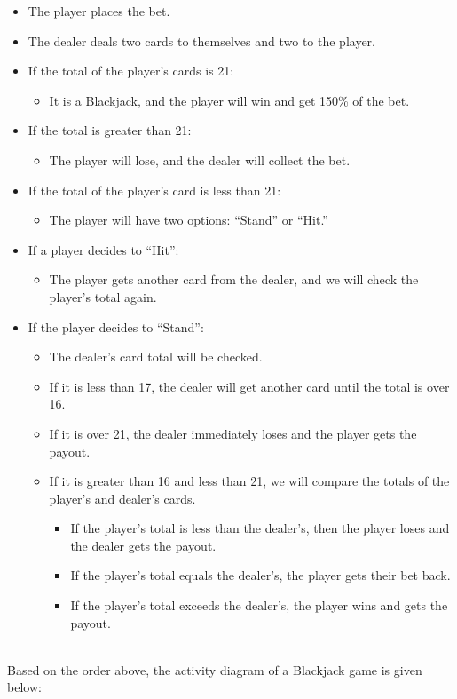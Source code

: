 \begin{itemize}
\item
The player places the bet.
\item
The dealer deals two cards to themselves and two to the player.
\item
If the total of the player's cards is 21:

\begin{itemize}
\item
It is a Blackjack, and the player will win and get 150\% of the bet.
\end{itemize}
\item
If the total is greater than 21:

\begin{itemize}
\item
The player will lose, and the dealer will collect the bet.
\end{itemize}
\item
If the total of the player's card is less than 21:

\begin{itemize}
\item
The player will have two options: ``Stand'' or ``Hit.''
\end{itemize}
\item
If a player decides to ``Hit'':

\begin{itemize}
\item
The player gets another card from the dealer, and we will check the player's total again.
\end{itemize}
\item
If the player decides to ``Stand'':

\begin{itemize}
\item
The dealer's card total will be checked.
\item
If it is less than 17, the dealer will get another card until the total is over 16.
\item
If it is over 21, the dealer immediately loses and the player gets the payout.
\item
If it is greater than 16 and less than 21, we will compare the totals of the player's and dealer's cards.

\begin{itemize}
\item
If the player's total is less than the dealer's, then the player loses and the dealer gets the payout.
\item
If the player's total equals the dealer's, the player gets their bet back.
\item
If the player's total exceeds the dealer's, the player wins and gets the payout.
\end{itemize}
\end{itemize}
\end{itemize}
\\
Based on the order above, the activity diagram of a Blackjack game is given below:

